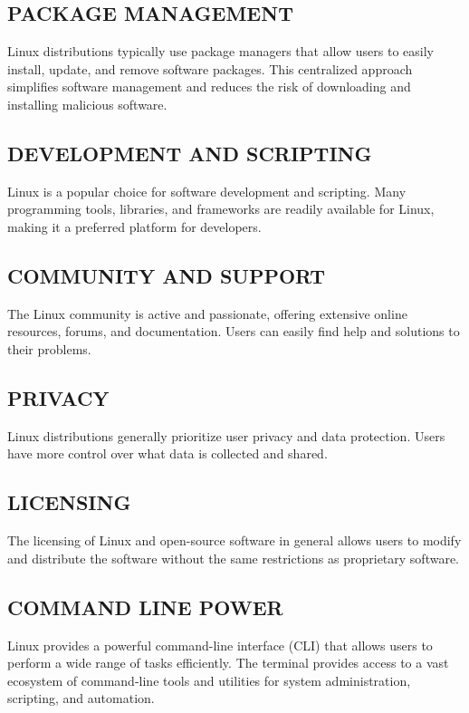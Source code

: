 \documentclass{article}
\begin{document}
\subsection{PACKAGE MANAGEMENT}
Linux distributions typically use package managers that allow users to easily install, update, and remove software packages. This centralized approach simplifies software management and reduces the risk of downloading and installing malicious software.
\newpage


\subsection{DEVELOPMENT AND SCRIPTING}
 Linux is a popular choice for software development and scripting. Many programming tools, libraries, and frameworks are readily available for Linux, making it a preferred platform for developers.

\subsection{COMMUNITY AND SUPPORT}
 The Linux community is active and passionate, offering extensive online resources, forums, and documentation. Users can easily find help and solutions to their problems.

\subsection{PRIVACY}
Linux distributions generally prioritize user privacy and data protection. Users have more control over what data is collected and shared.

\subsection{LICENSING}
The licensing of Linux and open-source software in general allows users to modify and distribute the software without the same restrictions as proprietary software.

\subsection{COMMAND LINE POWER}
 Linux provides a powerful command-line interface (CLI) that allows users to perform a wide range of tasks efficiently. The terminal provides access to a vast ecosystem of command-line tools and utilities for system administration, scripting, and automation.
\end{document}
